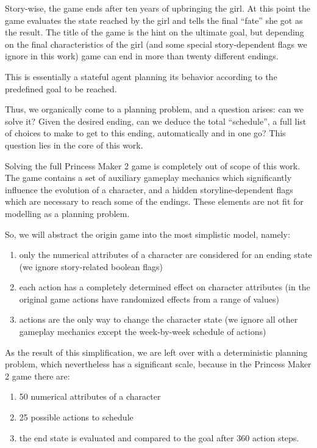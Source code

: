 \documentclass[12pt, a4paper]{article}
\begin{document}
	Story-wise, the game ends after ten years of upbringing the girl.
	At this point the game evaluates the state reached by the girl and tells the final ``fate'' she got as the result.
	The title of the game is the hint on the ultimate goal, but depending on the final characteristics of the girl (and some special story-dependent flags we ignore in this work) game can end in more than twenty different endings.
		
	This is essentially a stateful agent planning its behavior according to the predefined goal to be reached.
	
	Thus, we organically come to a planning problem, and a question arises: can we solve it? Given the desired ending, can we deduce the total ``schedule'', a full list of choices to make to get to this ending, automatically and in one go? This question lies in the core of this work.
	
	Solving the full Princess Maker 2 game is completely out of scope of this work.
	The game contains a set of auxiliary gameplay mechanics which significantly influence the evolution of a character, and a hidden storyline-dependent flags which are necessary to reach some of the endings.
	These elements are not fit for modelling as a planning problem.
	
	So, we will abstract the origin game into the most simplistic model, namely:
	
	\begin{enumerate}
		\item only the numerical attributes of a character are considered for an ending state (we ignore story-related boolean flags)
		\item each action has a completely determined effect on character attributes (in the original game actions have randomized effects from a range of values)
		\item actions are the only way to change the character state (we ignore all other gameplay mechanics except the week-by-week schedule of actions)
	\end{enumerate}

	As the result of this simplification, we are left over with a deterministic planning problem, which nevertheless has a significant scale, because in the Princess Maker 2 game there are:
	
	\begin{enumerate}
		\item 50 numerical attributes of a character
		\item 25 possible actions to schedule
		\item the end state is evaluated and compared to the goal after 360 action steps.
	\end{enumerate}
\end{document}
